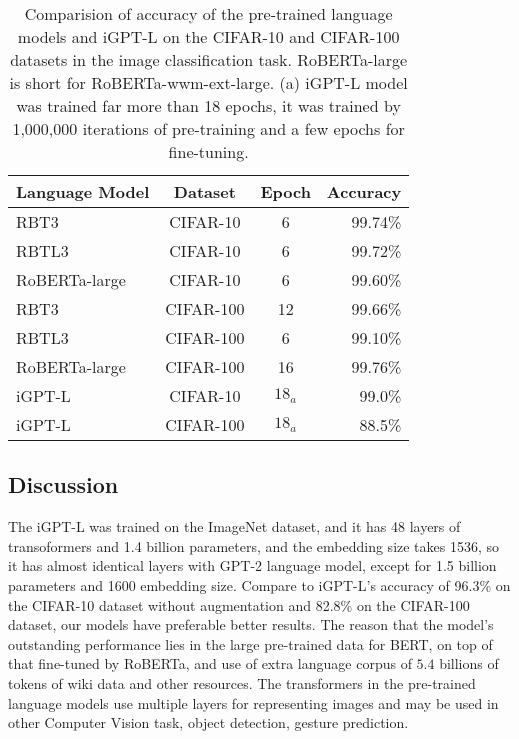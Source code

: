 \documentclass[10pt,twocolumn,letterpaper]{article}
\begin{document}
\begin{table}
\begin{center}
\begin{tabular}{|l|c|c|r|}
\hline
Language Model 	& Dataset & Epoch & Accuracy \\
\hline\hline
RBT3   & CIFAR-10 & 6	&	99.74\% \\
RBTL3  & CIFAR-10 & 6	&	99.72\% \\
RoBERTa-large  & CIFAR-10 & 6	&	99.60\% \\
\hline
RBT3   & CIFAR-100 & 12	&	99.66\% \\
RBTL3  & CIFAR-100 & 6  & 	99.10\% \\
RoBERTa-large & CIFAR-100 & 16 &	99.76\% \\
\hline\hline
iGPT-L & CIFAR-10 & $18_a$ & 99.0\%\\
iGPT-L & CIFAR-100 & $18_a$ & 88.5\%\\
\hline
\end{tabular}
\end{center}
\caption{Comparision of accuracy of the pre-trained language models and iGPT-L on the CIFAR-10 and CIFAR-100 datasets in the image classification task.
RoBERTa-large is short for RoBERTa-wwm-ext-large. (a) iGPT-L model was trained far more than 18 epochs, it was trained by 1,000,000 iterations of pre-training and a few epochs for fine-tuning.}
\end{table}


\subsection{Discussion}

The iGPT-L was trained on the ImageNet dataset, and it has 48 layers of transoformers and 1.4 billion parameters, and the embedding size takes 1536,
so it has almost identical layers with GPT-2 language model, except for 1.5 billion parameters and 1600 embedding size.
Compare to iGPT-L's accuracy of 96.3\% on the CIFAR-10 dataset without augmentation and 82.8\% on the CIFAR-100 dataset, our models have preferable better results.
The reason that the model's outstanding performance lies in the large pre-trained data for BERT, on top of that fine-tuned by RoBERTa, and use of extra language corpus of
$5.4$ billions of tokens of wiki data and other resources.
The transformers in the pre-trained language models use multiple layers for representing images and may be used in other Computer Vision task, \eg object detection, gesture prediction.
\end{document}
